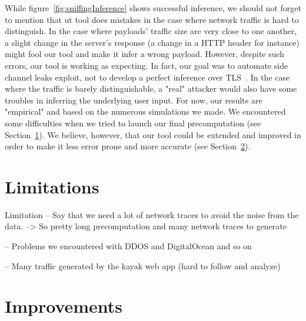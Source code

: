 \documentclass[runningheads]{llncs}
\begin{document}
While figure~\ref{fig:sniffingInference} shows successful inference, we should not forget to mention that ut tool does mistakes in the case where network traffic is hard to distinguish. In the case where payloads' traffic size are very close to one another, a slight change in the server's response (a change in a HTTP header for instance) might fool our tool and make it infer a wrong payload. However, despite such errors, our tool is working as expecting. In fact, our goal was to automate side channel leaks exploit, not to develop a perfect inference over TLS~. In the case where the traffic is barely distinguishable, a "real" attacker would also have some troubles in inferring the underlying user input. For now, our results are "empirical" and based on the numerous simulations we made. We encountered some difficulties when we tried to launch our final precomputation (see Section~\ref{sect:Limitations}). We believe, however, that our tool could be extended and improved in order to make it less error prone and more accurate (see Section~\ref{sect:Improvements}).


\section{Limitations}
\label{sect:Limitations}

Limitation -- Say that we need a lot of network traces to avoid the noise from the data. --> So pretty long precomputation  and many network traces to generate

-- Problems we encountered with DDOS and DigitalOcean and so on

-- Many traffic generated by the kayak web app (hard to follow and analyze)

\section{Improvements}
\label{sect:Improvements}
\end{document}

